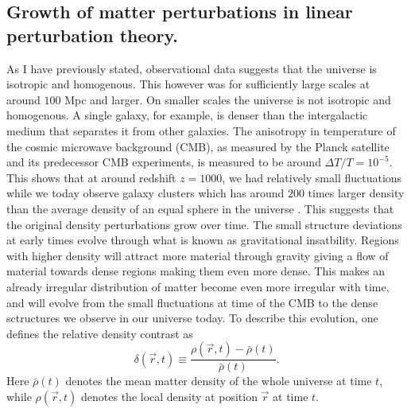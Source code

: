 \subsection{Growth of matter perturbations in linear perturbation theory.}\label{sec:linpert}
As I have previously stated, observational data suggests that the universe is isotropic and homogenous. This
however was for sufficiently large scales at around $100$ Mpc and larger. On
smaller scales the universe is not isotropic and homogenous. A single galaxy,
for example, is denser than the intergalactic medium that separates it from other
galaxies. The anisotropy in temperature of the cosmic microwave background (CMB), as measured by
the Planck satellite and its predecessor CMB experiments, is measured to be
around $\Delta T/T=10^{-5}$. This shows that at around redshift $z=1000$, we had
relatively small fluctuations while we today observe galaxy clusters which has around
$200$ times larger density than the average density of an equal sphere in the
universe \cite[p.~342]{schneider2006extragalactic}. This suggests that the original density
perturbations grow over time. The small structure deviations at early times evolve through what is known as gravitational insatbility.
Regions with higher density will attract more material through gravity giving a flow of material towards dense regions making them even more dense.
This makes an already irregular distribution of matter become even more irregular with time, and will evolve from the small fluctuations at time of the CMB
to the dense sctructures we observe in our universe today.
To describe this evolution, one defines the relative density
contrast as
\begin{equation}\label{eq:overdensity}
    \delta(\vec{r}, t) \equiv \frac{\rho(\vec{r}, t) - \bar{\rho}(t)}{\bar{\rho}(t)}.
\end{equation}
Here $\bar{\rho}(t)$ denotes the mean matter density of the whole universe at
time $t$, while $\rho(\vec{r}, t)$ denotes the local density at position
$\vec{r}$ at time $t$.\\

